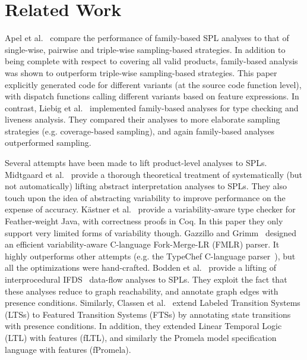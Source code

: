 \documentclass[11pt]{article}
\begin{document}
\section{Related Work}

Apel et al.~\cite{Apel:2013} compare the performance of family-based SPL analyses to that of single-wise, pairwise and triple-wise sampling-based strategies. In addition to being complete with respect to covering all valid products, family-based analysis was shown to outperform triple-wise sampling-based strategies. This paper explicitly generated code for different variants (at the source code function level), with dispatch functions calling different variants based on feature expressions. In contrast, Liebig et al.~\cite{Liebig:2013} implemented family-based analyses for type checking and liveness analysis. They compared their analyses to more elaborate sampling strategies (e.g. coverage-based sampling), and again family-based analyses outperformed sampling.

Several attempts have been made to lift product-level analyses to SPLs. Midtgaard et al.~\cite{Midtgaard:2015} provide a thorough theoretical treatment of systematically (but not automatically) lifting abstract interpretation analyses to SPLs. They also touch upon the idea of abstracting variability to improve performance on the expense of accuracy. K\"{a}stner et al.~\cite{Kastner:2012} provide a variability-aware type checker for Feather-weight Java, with correctness proofs in Coq. In this paper they only support very limited forms of variability though. Gazzillo and Grimm~\cite{Gazzillo:2012} designed an efficient variability-aware C-language Fork-Merge-LR (FMLR) parser. It highly outperforms other attempts (e.g. the TypeChef C-language parser~\cite{Kastner:2011}), but all the optimizations were hand-crafted. Bodden et al.~\cite{Bodden:2013} provide a lifting of interprocedural IFDS~\cite{Reps:1995} data-flow analyses to SPLs. They exploit the fact that these analyses reduce to graph reachability, and annotate graph edges with presence conditions. Similarly, Classen et al.~\cite{Classen:2013} extend Labeled Transition Systems (LTSs) to Featured Transition Systems (FTSs) by annotating state transitions with presence conditions. In addition, they extended Linear Temporal Logic (LTL) with features (fLTL), and similarly the Promela model specification language with features (fPromela). 


 
\end{document}
